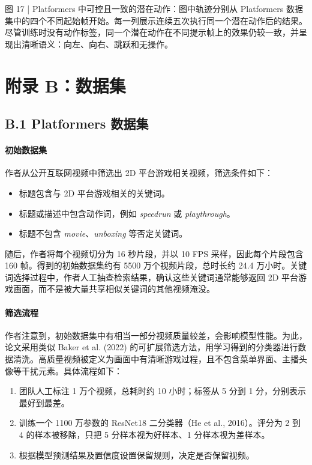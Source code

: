 \documentclass[10pt]{article}
\begin{document}
图 17 | Platformers 中可控且一致的潜在动作：图中轨迹分别从 Platformers 数据集中的四个不同起始帧开始。每一列展示连续五次执行同一个潜在动作后的结果。尽管训练时没有动作标签，同一个潜在动作在不同提示帧上的效果仍较一致，并呈现出清晰语义：向左、向右、跳跃和无操作。

\section*{附录 B：数据集}
\subsection*{B.1 Platformers 数据集}

\paragraph{初始数据集}
作者从公开互联网视频中筛选出 2D 平台游戏相关视频，筛选条件如下：
\begin{itemize}
  \item 标题包含与 2D 平台游戏相关的关键词。
  \item 标题或描述中包含动作词，例如 \textit{speedrun} 或 \textit{playthrough}。
  \item 标题不包含 \textit{movie}、\textit{unboxing} 等否定关键词。
\end{itemize}

随后，作者将每个视频切分为 16 秒片段，并以 10 FPS 采样，因此每个片段包含 160 帧。得到的初始数据集约有 5500 万个视频片段，总时长约 24.4 万小时。关键词选择过程中，作者人工抽查检索结果，确认这些关键词通常能够返回 2D 平台游戏画面，而不是被大量共享相似关键词的其他视频淹没。

\paragraph{筛选流程}
作者注意到，初始数据集中有相当一部分视频质量较差，会影响模型性能。为此，论文采用类似 Baker et al. (2022) 的可扩展筛选方法，用学习得到的分类器进行数据清洗。高质量视频被定义为画面中有清晰游戏过程，且不包含菜单界面、主播头像等干扰元素。具体流程如下：
\begin{enumerate}
  \item 团队人工标注 1 万个视频，总耗时约 10 小时；标签从 5 分到 1 分，分别表示最好到最差。
  \item 训练一个 1100 万参数的 ResNet18 二分类器（He et al., 2016）。评分为 2 到 4 的样本被移除，只把 5 分样本视为好样本、1 分样本视为差样本。
  \item 根据模型预测结果及置信度设置保留规则，决定是否保留视频。
\end{enumerate}
\end{document}
